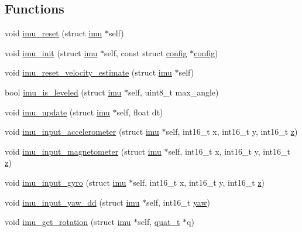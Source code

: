 \subsection*{Functions}
\begin{DoxyCompactItemize}
\item 
void \hyperlink{group__IMU_gac2f3d89971ad35932072f3d450ec4a07}{imu\+\_\+reset} (struct \hyperlink{structimu}{imu} $\ast$self)
\item 
void \hyperlink{group__IMU_ga52996c126e6e5673acf14a7300952af7}{imu\+\_\+init} (struct \hyperlink{structimu}{imu} $\ast$self, const struct \hyperlink{structconfig}{config} $\ast$\hyperlink{structconfig}{config})
\item 
void \hyperlink{group__IMU_ga5905e3300bfeafee44252ae58f7b98d2}{imu\+\_\+reset\+\_\+velocity\+\_\+estimate} (struct \hyperlink{structimu}{imu} $\ast$self)
\item 
bool \hyperlink{group__IMU_ga45c533ccb49a54d930c529880938a7cf}{imu\+\_\+is\+\_\+leveled} (struct \hyperlink{structimu}{imu} $\ast$self, uint8\+\_\+t max\+\_\+angle)
\item 
void \hyperlink{group__IMU_gaea89e9b064c1540b404b159a6299d3e1}{imu\+\_\+update} (struct \hyperlink{structimu}{imu} $\ast$self, float dt)
\item 
void \hyperlink{group__IMU_ga515a0c1950608b61bb91fdc26504dd86}{imu\+\_\+input\+\_\+accelerometer} (struct \hyperlink{structimu}{imu} $\ast$self, int16\+\_\+t x, int16\+\_\+t y, int16\+\_\+t \hyperlink{accelerometer_8h_ab3539ae3820541b70d17c66cfc5a0e3f}{z})
\item 
void \hyperlink{group__IMU_gafd573f1d86b59931a3588c939f233bcd}{imu\+\_\+input\+\_\+magnetometer} (struct \hyperlink{structimu}{imu} $\ast$self, int16\+\_\+t x, int16\+\_\+t y, int16\+\_\+t \hyperlink{accelerometer_8h_ab3539ae3820541b70d17c66cfc5a0e3f}{z})
\item 
void \hyperlink{group__IMU_ga57e6b2abb21fe897496e1d88104d40d2}{imu\+\_\+input\+\_\+gyro} (struct \hyperlink{structimu}{imu} $\ast$self, int16\+\_\+t x, int16\+\_\+t y, int16\+\_\+t \hyperlink{accelerometer_8h_ab3539ae3820541b70d17c66cfc5a0e3f}{z})
\item 
void \hyperlink{group__IMU_gaf2ec644e7cd76d0d74c6263c7cdb5b40}{imu\+\_\+input\+\_\+yaw\+\_\+dd} (struct \hyperlink{structimu}{imu} $\ast$self, int16\+\_\+t \hyperlink{sensors_8h_ad9679e37cfd53ac65eaf76de1951c753}{yaw})
\item 
void \hyperlink{group__IMU_gabace85956fa36d478c5d66b45465478f}{imu\+\_\+get\+\_\+rotation} (struct \hyperlink{structimu}{imu} $\ast$self, \hyperlink{quaternion_8h_afa59c16bbf0d057ddc01eb80bdd7c339}{quat\+\_\+t} $\ast$q)

\end{DoxyCompactItemize}
